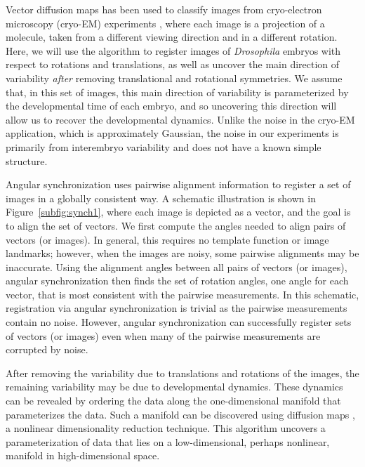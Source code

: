 \documentclass{pnastwo}
\begin{document}
\begin{article}
Vector diffusion maps has been used to classify images from cryo-electron microscopy (cryo-EM) experiments \cite{...}, where each image is a projection of a molecule, taken from a different viewing direction and in a different rotation. 
%
Here, we will use the algorithm to register images of {\it Drosophila} embryos with respect to rotations and translations, as well as uncover the main direction of variability {\it after} removing translational and rotational symmetries.
%
We assume that, in this set of images, this main direction of variability is parameterized by the developmental time of each embryo, and so uncovering this direction will allow us to recover the developmental dynamics. 
%
Unlike the noise in the cryo-EM application, which is approximately Gaussian, the noise in our experiments is primarily from interembryo variability and does not have a known simple structure.

Angular synchronization uses pairwise alignment information to register a set of images in a globally consistent way.
%
A schematic illustration is shown in Figure~\ref{subfig:synch1}, where each image is depicted as a vector, and the goal is to align the set of vectors. 
%
We first compute the angles needed to align pairs of vectors (or images).
%
In general, this requires no template function or image landmarks; however, when the images are noisy, some pairwise alignments may be inaccurate.
%
Using the alignment angles between all pairs of vectors (or images), angular synchronization then finds the set of rotation angles, one angle for each vector, that is most consistent with the pairwise measurements. 
%
In this schematic, registration via angular synchronization is trivial as the pairwise measurements contain no noise. 
%
However, angular synchronization can successfully register sets of vectors (or images) even when many of the pairwise measurements are corrupted by noise. 
%

%
After removing the variability due to translations and rotations of the images, the remaining variability may be due to developmental dynamics.
% 
These dynamics can be revealed by ordering the data along the one-dimensional manifold that parameterizes the data. 
%
Such a manifold can be discovered using diffusion maps \cite{coifman2005geometric}, a nonlinear dimensionality reduction technique.
%
This algorithm uncovers a parameterization of data that lies on a low-dimensional, perhaps nonlinear, manifold in high-dimensional space. 
%


\end{article}
\end{document}
